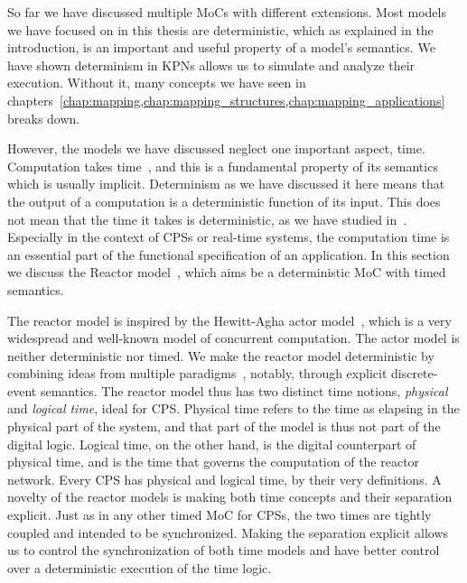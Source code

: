 So far we have discussed multiple \acp{MoC} with different extensions.
Most models we have focused on in this thesis are deterministic, which as explained in the introduction, is an important and useful property of a model's semantics.
We have shown determinism in \acp{KPN} allows us to simulate and analyze their execution.
Without it, many concepts we have seen in chapters~\ref{chap:mapping,chap:mapping_structures,chap:mapping_applications} breaks down.

However, the models we have discussed neglect one important aspect, time.
Computation takes time~\cite{lee2009computing}, and this is a fundamental property of its semantics which is usually implicit.
Determinism as we have discussed it here means that the output of a computation is a deterministic function of its input.
This does not mean that the time it takes is deterministic, as we have studied in~\cite{goens_scopes17}.
Especially in the context of \acp{CPS} or real-time systems, the computation time is an essential part of the functional specification of an application.
In this section we discuss the Reactor model~\cite{lohstroh_dac19}, which aims be a deterministic \ac{MoC} with timed semantics.

The reactor model is inspired by the Hewitt-Agha actor model~\cite{Agha:86:Actors}, which is a very widespread and well-known model of concurrent computation.
The actor model is neither deterministic nor timed.
We make the reactor model deterministic by combining ideas from multiple paradigms~\cite{lohstroh_fdl19}, notably, through explicit discrete-event semantics.
The reactor model thus has two distinct time notions, \emph{physical} and \emph{logical time}, ideal for \ac{CPS}.
Physical time refers to the time as elapsing in the physical part of the system, and that part of the model is thus not part of the digital logic.
Logical time, on the other hand, is the digital counterpart of physical time, and is the time that governs the computation of the reactor network.
Every \ac{CPS} has physical and logical time, by their very definitions. A novelty of the reactor models is making both time concepts and their separation explicit.
Just as in any other timed \ac{MoC} for \acp{CPS}, the two times are tightly coupled and intended to be synchronized. 
Making the separation explicit allows us to control the synchronization of both time models and have better control over a deterministic execution of the time logic.

